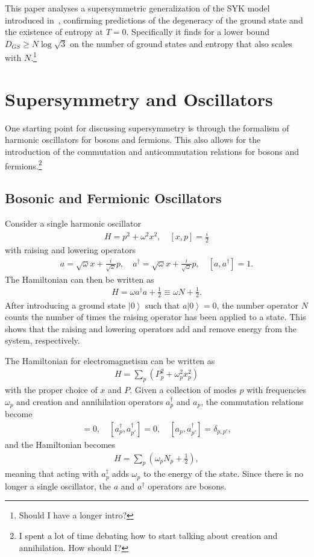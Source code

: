 \documentclass[12pt]{article} %
\renewcommand{\th}[1]{\frac{1}{#1}}
\newcommand{\om}{\omega}
\newcommand{\ket}[1]{\left|#1\right\rangle}
\newcommand{\comm}[2]{\left[#1,#2\right]}
\begin{document}
This paper analyses a supersymmetric generalization of the SYK model introduced in~\cite{fu16}, confirming predictions of the degeneracy of the ground state and the existence of entropy at $T=0$. Specifically it finds for a lower bound $D_{GS}\ge N\log\sqrt{3}$ on the number of ground states and entropy that also scales with $N$.\footnote{Should I have a longer intro?}



\section{Supersymmetry and Oscillators}

One starting point for discussing supersymmetry is through the formalism of harmonic oscillators for bosons and fermions. This also allows for the introduction of the commutation and anticommutation relations for bosons and fermions.\footnote{I spent a lot of time debating how to start talking about creation and annihilation. How should I?}

\subsection{Bosonic and Fermionic Oscillators} \emph{}

Consider a single harmonic oscillator 
\begin{align}
H = p^2 +\om^2 x^2,\quad \comm{x}{p} = \frac{i}{2} \label{eqn:harmosc}
\end{align}
with raising and lowering operators
\begin{align}
a = \sqrt{\om}x+\frac{i}{\sqrt{\om}}p,\quad a^\dag = \sqrt{\om}x+\frac{i}{
	\sqrt{\om}}p,\quad \comm{a}{a^\dag } = 1.
\end{align}
The Hamiltonian can then be written as 
\begin{align}
H = \om a^\dag a + \th{2} \equiv \om N + \th{2}.
\end{align}
After introducing a ground state $\ket{0}$ such that $a\ket{0} = 0$, the number operator $N$ counts the number of times the raising operator has been applied to a state. This shows that the raising and lowering operators add and remove energy from the system, respectively. 

The Hamiltonian for electromagnetism can be written as
\begin{align}
H = \sum_p \left(P_p^2 + \om_p^2x_p^2\right)
\end{align}
with the proper choice of $x$ and $P$. Given a collection of modes $p$ with frequencies $\om_p$ and creation and annihilation operators $a_p^\dag$ and $a_p$, the commutation relations become 
\begin{align}
[a_p, a_{p'}] = 0,\quad [a^\dag_p, a^\dag_{p'}]=0, \quad[a_p,a^\dag_{p'}] = 
	\delta_{p,p'},
\end{align}
and the Hamiltonian becomes
\begin{align}
H = \sum_p\left(\om_pN_p+\th{2}\right),
\end{align}
meaning that acting with $a_p^\dag$ adds $\om_p$ to the energy of the state. Since there is no longer a single oscillator, the $a$ and $a^\dag$ operators are bosons. 
\end{document}
